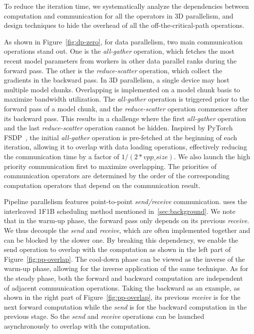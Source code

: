 To reduce the iteration time, we systematically analyze the dependencies between
computation and communication for all the operators in 3D parallelism, and
design techniques to hide the overhead of all the off-the-critical-path
operations.


As shown in Figure~\ref{fig:dp-zero}, for data parallelism, two main
communication operations stand out. One is the \textit{all-gather} operation,
which fetches the most recent model parameters from workers in other data
parallel ranks during the forward pass. The other is the \textit{reduce-scatter}
operation, which collect the gradients in the backward pass. In 3D parallelism,
a single device may host multiple model chunks. Overlapping is implemented on a
model chunk basis to maximize bandwidth utilization. The \textit{all-gather}
operation is triggered prior to the forward pass of a model chunk, and the
\textit{reduce-scatter} operation commences after its backward pass. This
results in a challenge where the first \textit{all-gather} operation and the
last \textit{reduce-scatter} operation cannot be hidden. Inspired by PyTorch
FSDP~\cite{pytorch_fsdp}, the initial \textit{all-gather} operation is
pre-fetched at the beginning of each iteration, allowing it to overlap with data
loading operations, effectively reducing the communication time by a factor of
$1/(2*vpp\_size)$.
We also launch the high priority communication first to maximize overlapping. The priorities of communication operators are determined by the order of the corresponding computation operators that depend on the communication result. 


 Pipeline parallelism features point-to-point \textit{send/receive} communication. \sysname uses the interleaved 1F1B scheduling method mentioned in~\ref{sec:background}. We note that in the warm-up phase, the forward pass only depends on its previous \textit{receive}. We thus decouple the \textit{send} and \textit{receive}, which are often implemented together and can be blocked by the slower one. By breaking this dependency, we enable the send operation to overlap with the computation as shown in the left part of Figure~\ref{fig:pp-overlap}. The cool-down phase can be viewed as the inverse of the warm-up phase, allowing for the inverse application of the same technique. As for the steady phase, both the forward and backward computation are independent of adjacent communication operations. Taking the backward as an example, as shown in the right part of Figure~\ref{fig:pp-overlap}, its previous \textit{receive} is for the next forward computation while the \textit{send} is for the backward computation in the previous stage. So the \textit{send} and \textit{receive} operations can be launched asynchronously to overlap with the computation.


